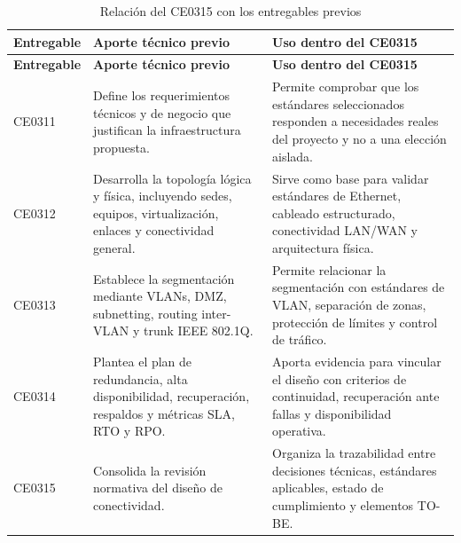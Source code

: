 \documentclass[11pt, a4paper, oneside]{report}
\begin{document}
\begin{xltabular}{\textwidth}{@{}|L{3cm}|X|X|@{}}
\caption{Relación del CE0315 con los entregables previos}
\label{tab:relacion_ce0315_entregables_previos} \\

\parbox[c][1.1cm][c]{\linewidth}{\centering\color{white}\bfseries\small Entregable} &
\parbox[c][1.1cm][c]{\linewidth}{\centering\color{white}\bfseries\small Aporte técnico previo} &
\parbox[c][1.1cm][c]{\linewidth}{\centering\color{white}\bfseries\small Uso dentro del CE0315} \\ \hline
\endfirsthead

\parbox[c][1.1cm][c]{\linewidth}{\centering\color{white}\bfseries\small Entregable} &
\parbox[c][1.1cm][c]{\linewidth}{\centering\color{white}\bfseries\small Aporte técnico previo} &
\parbox[c][1.1cm][c]{\linewidth}{\centering\color{white}\bfseries\small Uso dentro del CE0315} \\ \hline
\endhead

\hline
\endfoot

{\small CE0311} &
{\small Define los requerimientos técnicos y de negocio que justifican la infraestructura propuesta.} &
{\small Permite comprobar que los estándares seleccionados responden a necesidades reales del proyecto y no a una elección aislada.} \\ \hline

{\small CE0312} &
{\small Desarrolla la topología lógica y física, incluyendo sedes, equipos, virtualización, enlaces y conectividad general.} &
{\small Sirve como base para validar estándares de Ethernet, cableado estructurado, conectividad LAN/WAN y arquitectura física.} \\ \hline

{\small CE0313} &
{\small Establece la segmentación mediante VLANs, DMZ, subnetting, routing inter-VLAN y trunk IEEE 802.1Q.} &
{\small Permite relacionar la segmentación con estándares de VLAN, separación de zonas, protección de límites y control de tráfico.} \\ \hline

{\small CE0314} &
{\small Plantea el plan de redundancia, alta disponibilidad, recuperación, respaldos y métricas SLA, RTO y RPO.} &
{\small Aporta evidencia para vincular el diseño con criterios de continuidad, recuperación ante fallas y disponibilidad operativa.} \\ \hline

{\small CE0315} &
{\small Consolida la revisión normativa del diseño de conectividad.} &
{\small Organiza la trazabilidad entre decisiones técnicas, estándares aplicables, estado de cumplimiento y elementos TO-BE.} \\ \hline

\end{xltabular}
\end{document}

